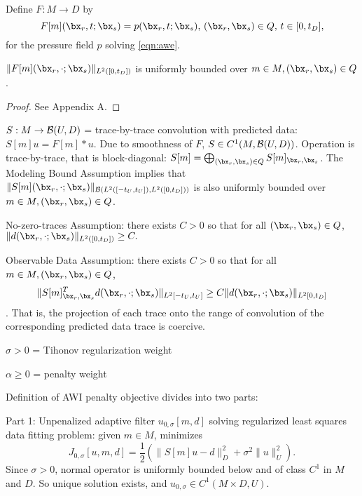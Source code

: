 Define $F: M \rightarrow D$ by
\[
  F[m](\bx_r,t;\bx_s) = p(\bx_r,t;\bx_s), \, (\bx_r,\bx_s) \in Q, \, t \in [0,t_D],
\]
for the pressure field $p$ solving \ref{eqn:awe}.

\begin{theorem}
  \label{thm:mbd}
  $\|F[m](\bx_r,\cdot;\bx_s)\|_{L^2([0,t_D])}$ is uniformly bounded over $m \in M, (\bx_r,\bx_s) \in Q$.
\end{theorem}
\begin{proof}
  See Appendix A.
\end{proof}

$S: M \rightarrow {\cal B}(U,D)$ = trace-by-trace convolution with predicted data: $S[m]u = F[m] * u$. Due to smoothness of $F$, $S \in C^1(M,{\cal B}(U,D))$. Operation is trace-by-trace, that is block-diagonal: $S[m] = \bigoplus_{(\bx_r,\bx_s) \in Q}S[m]_{\bx_r,\bx_s}$. The Modeling Bound Assumption implies that $\|S[m](\bx_r,\cdot;\bx_s)\|_{{\cal B}(L^2([-t_U,t_U]),L^2([0,t_D]))}$ is also uniformly bounded over $m \in M, (\bx_r,\bx_s) \in Q$.

No-zero-traces Assumption: there exists $C>0$ so that for all $(\bx_r,\bx_s) \in Q$,
$\|d(\bx_r,\cdot;\bx_s)\|_{L^2([0,t_D])} \ge C.$

Observable Data Assumption: there exists $C>0$ so that for all $m \in M, (\bx_r,\bx_s) \in Q$,
\begin{equation}
  \label{eqn:obsdata}
  \|S[m]_{\bx_r,\bx_s}^Td(\bx_r,\cdot;\bx_s)\|_{L^2[-t_U,t_U]} \ge C \|d(\bx_r,\cdot;\bx_s)\|_{L^2[0,t_D]}
\end{equation}.
That is, the projection of each trace onto the range of convolution of the corresponding predicted data trace is coercive.  

$\sigma > 0$ = Tihonov regularization weight

$\alpha \ge 0$ = penalty weight

Definition of AWI penalty objective divides into two parts:

Part 1: Unpenalized adaptive filter $u_{0,\sigma}[m,d]$ solving regularized least squares data fitting problem:  given $m \in M$, minimizes
\[
 J_{0,\sigma}[u,m,d] = \frac{1}{2}(\|S[m]u - d\|_D^2 + \sigma^2 \|u\|^2_U).
\]
Since $\sigma > 0$, normal operator is uniformly bounded below and of class $C^1$ in $M$ and $D$. So unique solution exists, and $u_{0,\sigma} \in C^1(M \times D, U)$.

